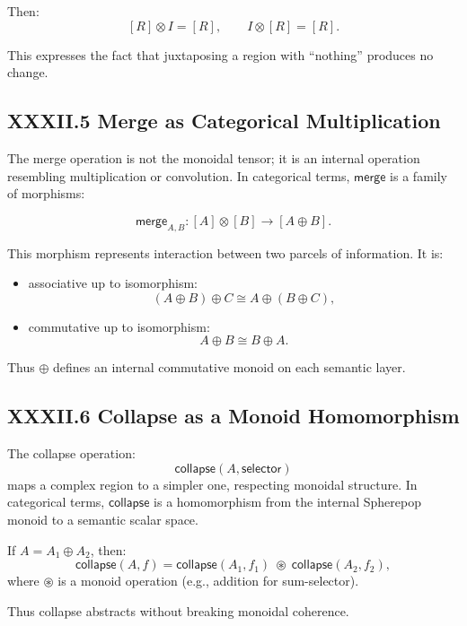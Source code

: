 \documentclass[11pt,letterpaper]{article}
\begin{document}
Then:
\[
[R] \otimes I = [R], \qquad I \otimes [R] = [R].
\]

This expresses the fact that juxtaposing a region with ``nothing'' produces no change.

\subsection{XXXII.5 Merge as Categorical Multiplication}

The merge operation is not the monoidal tensor; it is an internal operation resembling multiplication or convolution. In categorical terms, $\mathsf{merge}$ is a family of morphisms:

\[
\mathsf{merge}_{A,B} : [A] \otimes [B] \to [A \oplus B].
\]

This morphism represents interaction between two parcels of information. It is:

\begin{itemize}
    \item associative up to isomorphism:
    \[
    (A \oplus B) \oplus C \cong A \oplus (B \oplus C),
    \]
    \item commutative up to isomorphism:
    \[
    A \oplus B \cong B \oplus A.
    \]
\end{itemize}

Thus $\oplus$ defines an internal commutative monoid on each semantic layer.

\subsection{XXXII.6 Collapse as a Monoid Homomorphism}

The collapse operation:
\[
\mathsf{collapse}(A, \mathsf{selector})
\]
maps a complex region to a simpler one, respecting monoidal structure. In categorical terms, $\mathsf{collapse}$ is a homomorphism from the internal Spherepop monoid to a semantic scalar space.

If $A = A_1 \oplus A_2$, then:
\[
\mathsf{collapse}(A, f)
=
\mathsf{collapse}(A_1, f_1) \;\circledast\;
\mathsf{collapse}(A_2, f_2),
\]
where $\circledast$ is a monoid operation (e.g., addition for sum-selector).

Thus collapse abstracts without breaking monoidal coherence.
\end{document}
